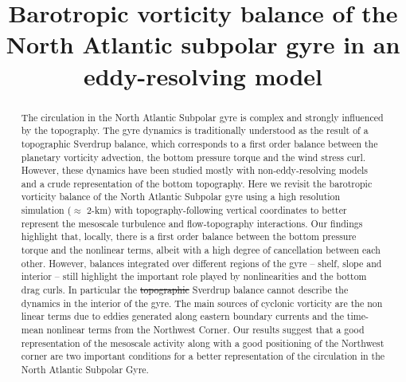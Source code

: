 \documentclass[os, manuscript]{copernicus}
\providecommand{\DIFadd}[1]{{\protect\color{blue}\uwave{#1}}} %
\providecommand{\DIFdel}[1]{{\protect\color{red}\sout{#1}}}                      %
\providecommand{\DIFaddbegin}{} %
\providecommand{\DIFaddend}{} %
\providecommand{\DIFdelbegin}{} %
\providecommand{\DIFdelend}{} %
\begin{document}
\title{Barotropic vorticity balance of the North Atlantic subpolar gyre in an eddy-resolving model}











\received{}
\pubdiscuss{} %
\revised{}
\accepted{}
\published{}




\maketitle



\begin{abstract}
The circulation in the North Atlantic Subpolar gyre is complex and strongly influenced by the topography. The gyre dynamics is traditionally understood as the result of a topographic Sverdrup balance, which corresponds to a first order balance between the planetary vorticity advection, the bottom pressure torque and the wind stress curl. However, these dynamics have been studied mostly with non-eddy-resolving models and a crude representation of the bottom topography. Here we revisit the barotropic vorticity balance of the North Atlantic Subpolar gyre using a high resolution simulation ($\approx$ 2-km) with topography-following vertical coordinates to better represent the mesoscale turbulence and flow-topography interactions. Our findings highlight that, locally, there is a first order balance  between the bottom pressure torque and the nonlinear terms, albeit with a high degree of cancellation between each other. However, balances integrated over different regions of the gyre -- shelf, slope and interior -- still highlight the important role played by nonlinearities and the bottom drag curls. In particular the \DIFdelbegin \DIFdel{topographic }\DIFdelend \DIFaddbegin \DIFadd{flat bottomed }\DIFaddend Sverdrup balance cannot describe the dynamics in the interior of the gyre. The main sources of cyclonic vorticity are the non linear terms due to eddies generated along eastern boundary currents and the time-mean nonlinear terms from the Northwest Corner. Our results suggest that a good representation of the mesoscale activity along with a good positioning of the Northwest corner are two important conditions for a better representation of the circulation in the North Atlantic Subpolar Gyre.
\end{abstract}
\end{document}
